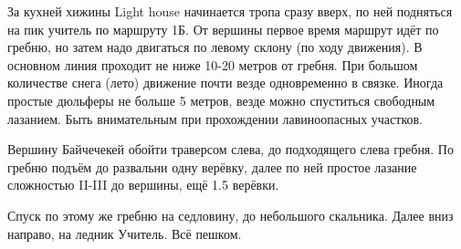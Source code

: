 За кухней хижины Light house начинается тропа сразу вверх, по ней
подняться на пик учитель по маршруту 1Б. От вершины первое время
маршрут идёт по гребню, но затем надо двигаться по левому склону (по
ходу движения). В основном линия проходит не ниже 10-20 метров от
гребня. При большом количестве снега (лето) движение почти везде
одновременно в связке. Иногда простые дюльферы не больше 5 метров,
везде можно спуститься свободным лазанием. Быть внимательным при
прохождении лавиноопасных участков.

Вершину Байчечекей обойти траверсом слева, до подходящего слева
гребня. По гребню подъём до развальни одну верёвку, далее по ней
простое лазание сложностью II-III до вершины, ещё 1.5 верёвки.

Спуск по этому же гребню на седловину, до небольшого скальника. Далее
вниз направо, на ледник Учитель. Всё пешком.
